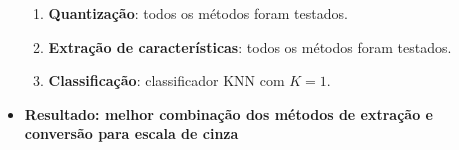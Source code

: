 \begin{itemize}
\begin{enumerate}
\item \textbf{Quantização}: todos os métodos foram testados.
\item \textbf{Extração de características}: todos os métodos foram testados.
\item \textbf{Classificação}: classificador KNN com $K=1$.
\end{enumerate}

\item[] \textbf{Resultado: melhor combinação dos métodos de extração e conversão para escala de cinza}

%

\end{itemize}
